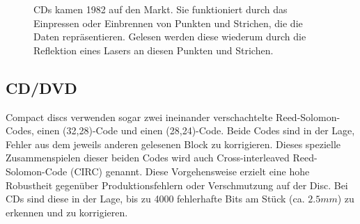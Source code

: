 \begin{figure}
	\centering
	\caption{CDs kamen 1982 auf den Markt. Sie funktioniert durch das Einpressen oder Einbrennen von Punkten und Strichen, die die Daten repräsentieren. Gelesen werden diese wiederum durch die Reflektion eines Lasers an diesen Punkten und Strichen.}
	\label{fig:cd}
\end{figure}
% 
%
%
%
%
%
%
%


\subsection{CD/DVD}
Compact discs verwenden sogar zwei ineinander verschachtelte Reed-Solomon-Codes, einen (32,28)-Code und einen (28,24)-Code.
Beide Codes sind in der Lage, Fehler aus dem jeweils anderen gelesenen Block zu korrigieren. Dieses spezielle Zusammenspielen dieser beiden Codes wird auch Cross-interleaved Reed-Solomon-Code (CIRC) genannt.
%
%
Diese Vorgehensweise erzielt eine hohe Robustheit gegenüber Produktionsfehlern oder Verschmutzung auf der Disc. Bei CDs sind diese in der Lage, bis zu 4000 fehlerhafte Bits am Stück (ca. $2.5mm$) zu erkennen und zu korrigieren. 

